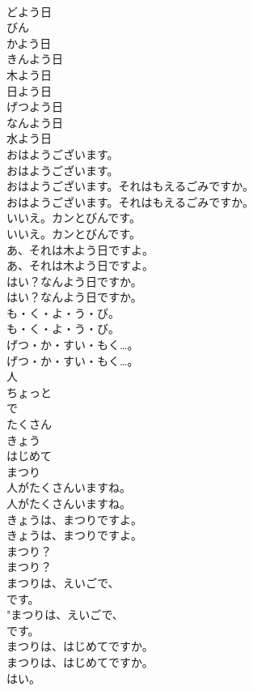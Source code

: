 \documentclass[8pt]{extreport}
\begin{document}
\begin{CJK}{UTF8}{min}
\\	どよう日
\\	びん
\\	かよう日
\\	きんよう日
\\	木よう日
\\	日よう日
\\	げつよう日
\\	なんよう日
\\	水よう日
\\	おはようございます。	
\\	おはようございます。 
\\	おはようございます。それはもえるごみですか。	
\\	おはようございます。それはもえるごみですか。 
\\	いいえ。カンとびんです。	
\\	いいえ。カンとびんです。 
\\	あ、それは木よう日ですよ。	
\\	あ、それは木よう日ですよ。 
\\	はい？なんよう日ですか。	
\\	はい？なんよう日ですか。 
\\	も・く・よ・う・び。	
\\	も・く・よ・う・び。 
\\	げつ・か・すい・もく…。	
\\	げつ・か・すい・もく…。 
\\	人
\\	ちょっと
\\	で
\\	たくさん
\\	きょう
\\	はじめて
\\	まつり
\\	人がたくさんいますね。	
\\	人がたくさんいますね。 
\\	きょうは、まつりですよ。	
\\	きょうは、まつりですよ。 
\\	まつり？	
\\	まつり？ 
\\	まつりは、えいごで、
\\	です。	
\\	"まつりは、えいごで、
\\	です。 
\\	まつりは、はじめてですか。	
\\	まつりは、はじめてですか。 
\\	はい。	

\end{CJK}
\end{document}
